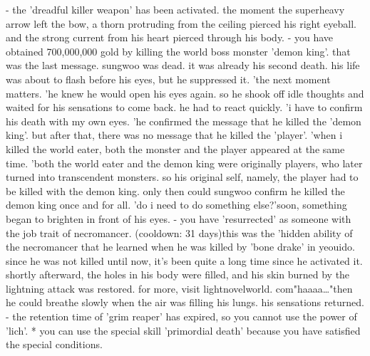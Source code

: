 - the 'dreadful killer weapon' has been activated.
the moment the superheavy arrow left the bow, a thorn protruding from the ceiling pierced his right eyeball.
 and the strong current from his heart pierced through his body.
- you have obtained 700,000,000 gold by killing the world boss monster 'demon king'.
that was the last message.
sungwoo was dead.
 it was already his second death.
his life was about to flash before his eyes, but he suppressed it.
'the next moment matters.
'he knew he would open his eyes again.
 so he shook off idle thoughts and waited for his sensations to come back.
 he had to react quickly.
'i have to confirm his death with my own eyes.
'he confirmed the message that he killed the 'demon king'.
 but after that, there was no message that he killed the 'player'.
'when i killed the world eater, both the monster and the player appeared at the same time.
'both the world eater and the demon king were originally players, who later turned into transcendent monsters.
 so his original self, namely, the player had to be killed with the demon king.
 only then could sungwoo confirm he killed the demon king once and for all.
'do i need to do something else?'soon, something began to brighten in front of his eyes.
- you have 'resurrected' as someone with the job trait of necromancer.
 (cooldown: 31 days)this was the 'hidden ability of the necromancer that he learned when he was killed by 'bone drake' in yeouido.
 since he was not killed until now, it's been quite a long time since he activated it.
 shortly afterward, the holes in his body were filled, and his skin burned by the lightning attack was restored.
for more, visit lightnov­elworld.
c‌om"haaaa…"then he could breathe slowly when the air was filling his lungs.
his sensations returned.
- the retention time of 'grim reaper' has expired, so you cannot use the power of 'lich'.
* you can use the special skill 'primordial death' because you have satisfied the special conditions.


